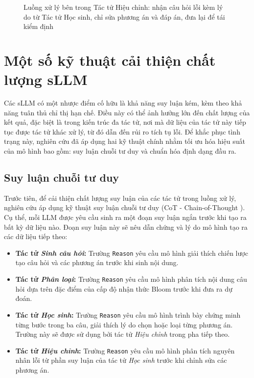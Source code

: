 \begin{figure}[htbp]
    \centering
    \resizebox{0.85\textwidth}{!}{}
    \caption{Luồng xử lý bên trong Tác tử Hiệu chỉnh: nhận câu hỏi lỗi kèm lý do từ Tác tử Học sinh, chỉ sửa phương án và đáp án, đưa lại để tái kiểm định}
    \label{fig:agent-fixer}
\end{figure}

\section{Một số kỹ thuật cải thiện chất lượng sLLM}
Các sLLM có một nhược điểm cố hữu là khả năng suy luận kém, kèm theo khả năng tuân thủ chỉ thị hạn chế. Điều này có thể ảnh hưởng lớn đến chất lượng của kết quả, đặc biệt là trong kiến trúc đa tác tử, nơi mà dữ liệu của tác tử này tiếp tục được tác tử khác xử lý, từ đó dẫn đến rủi ro tích tụ lỗi. Để khắc phục tình trạng này, nghiên cứu đã áp dụng hai kỹ thuật chính nhằm tối ưu hóa hiệu suất của mô hình bao gồm: suy luận chuỗi tư duy và chuẩn hóa định dạng đầu ra.

\subsection{Suy luận chuỗi tư duy}
Trước tiên, để cải thiện chất lượng suy luận của các tác tử trong luồng xử lý, nghiên cứu áp dụng kỹ thuật suy luận chuỗi tư duy (CoT - Chain-of-Thought \cite{wei2022chain}). Cụ thể, mỗi LLM được yêu cầu sinh ra một đoạn suy luận ngắn trước khi tạo ra bất kỳ dữ liệu nào. Đoạn suy luận này sẽ nêu dẫn chứng và lý do mô hình tạo ra các dữ liệu tiếp theo:

\begin{itemize}
    \item \textbf{Tác tử \textit{Sinh câu hỏi}:} Trường \texttt{Reason} yêu cầu mô hình giải thích chiến lược tạo câu hỏi và các phương án trước khi sinh nội dung.
    \item \textbf{Tác tử \textit{Phân loại}:} Trường \texttt{Reason} yêu cầu mô hình phân tích nội dung câu hỏi dựa trên đặc điểm của cấp độ nhận thức Bloom trước khi đưa ra dự đoán.
    \item \textbf{Tác tử \textit{Học sinh}:} Trường \texttt{Reason} yêu cầu mô hình trình bày chứng minh từng bước trong ba câu, giải thích lý do chọn hoặc loại từng phương án. Trường này sẽ được sử dụng bởi tác tử \textit{Hiệu chỉnh} trong pha tiếp theo.
    \item \textbf{Tác tử \textit{Hiệu chỉnh}:} Trường \texttt{Reason} yêu cầu mô hình phân tích nguyên nhân lỗi từ phần suy luận của tác tử \textit{Học sinh} trước khi chỉnh sửa các phương án.
\end{itemize}

